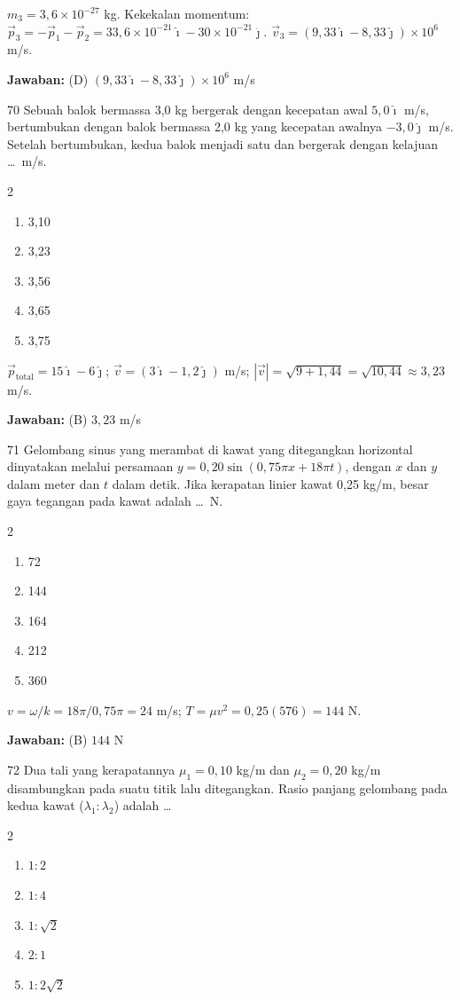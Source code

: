 \documentclass[11pt]{article}
\newenvironment{pilB}{%
  \par\smallskip\begin{multicols}{2}
  \begin{enumerate}[label=(\Alph*),leftmargin=*,itemsep=1pt,topsep=3pt]}%
  {\end{enumerate}\end{multicols}}
\newcommand{\jawaban}[1]{%
  \noindent\colorbox{gold!30}{\parbox{\dimexpr\linewidth-2\fboxsep\relax}{%
    \textbf{Jawaban:} #1}}\par\smallskip}
\begin{document}
\begin{pembox}
$m_3=3{,}6\times10^{-27}$ kg. Kekekalan momentum: $\vec{p}_3=-\vec{p}_1-\vec{p}_2=33{,}6\times10^{-21}\hat{\imath}-30\times10^{-21}\hat{\jmath}$. $\vec{v}_3=(9{,}33\hat{\imath}-8{,}33\hat{\jmath})\times10^6$ m/s.
\jawaban{(D) $(9{,}33\hat{\imath}-8{,}33\hat{\jmath})\times10^6$ m/s}
\end{pembox}

\begin{soal}{70}
Sebuah balok bermassa 3,0 kg bergerak dengan kecepatan awal
$5{,}0\hat{\imath}$ m/s, bertumbukan dengan balok bermassa 2,0 kg yang
kecepatan awalnya $-3{,}0\hat{\jmath}$ m/s. Setelah bertumbukan, kedua
balok menjadi satu dan bergerak dengan kelajuan \ldots\ m/s.
\begin{pilB}
  \item 3,10 \item 3,23 \item 3,56 \item 3,65 \item 3,75
\end{pilB}
\end{soal}

\begin{pembox}
$\vec{p}_{\text{total}}=15\hat{\imath}-6\hat{\jmath}$; $\vec{v}=(3\hat{\imath}-1{,}2\hat{\jmath})$ m/s; $|\vec{v}|=\sqrt{9+1{,}44}=\sqrt{10{,}44}\approx3{,}23$ m/s.
\jawaban{(B) $3{,}23$ m/s}
\end{pembox}

\begin{soal}{71}
Gelombang sinus yang merambat di kawat yang ditegangkan horizontal
dinyatakan melalui persamaan $y=0{,}20\sin(0{,}75\pi x+18\pi t)$,
dengan $x$ dan $y$ dalam meter dan $t$ dalam detik. Jika kerapatan
linier kawat 0,25 kg/m, besar gaya tegangan pada kawat adalah \ldots\ N.
\begin{pilB}
  \item 72 \item 144 \item 164 \item 212 \item 360
\end{pilB}
\end{soal}

\begin{pembox}
$v=\omega/k=18\pi/0{,}75\pi=24$ m/s; $T=\mu v^2=0{,}25(576)=144$ N.
\jawaban{(B) $144$ N}
\end{pembox}

\begin{soal}{72}
Dua tali yang kerapatannya $\mu_1=0{,}10$ kg/m dan $\mu_2=0{,}20$ kg/m
disambungkan pada suatu titik lalu ditegangkan. Rasio panjang gelombang
pada kedua kawat ($\lambda_1:\lambda_2$) adalah \ldots
\begin{pilB}
  \item $1:2$ \item $1:4$ \item $1:\sqrt{2}$ \item $2:1$ \item $1:2\sqrt{2}$
\end{pilB}
\end{soal}
\end{document}
